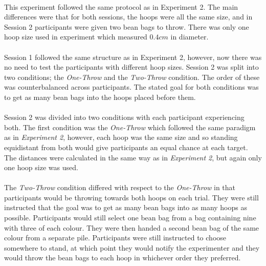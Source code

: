 \documentclass[12pt]{article}
\begin{document}
\paragraph{} This experiment followed the same protocol as in Experiment 2. The main differences were that for both sessions, the hoops were all the same size, and in Session 2 participants were given two bean bags to throw. There was only one hoop size used in experiment which measured $0.4cm$ in diameter.

\paragraph{} Session 1 followed the same structure as in Experiment 2, however, now there was no need to test the participants with different hoop sizes. Session 2 was split into two conditions; the \textit{One-Throw} and the \textit{Two-Throw} condition. The order of these was counterbalanced across participants. The stated goal for both conditions was to get as many bean bags into the hoops placed before them.

\paragraph{} Session 2 was divided into two conditions with each participant experiencing both. The first condition was the \textit{One-Throw} which followed the same paradigm as in \textit{Experiment 2}, however, each hoop was the same size and so standing equidistant from both would give participants an equal chance at each target. The distances were calculated in the same way as in \textit{Experiment 2}, but again only one hoop size was used. 

\paragraph{} The \textit{Two-Throw} condition differed with respect to the \textit{One-Throw} in that participants would be throwing towards both hoops on each trial. They were still instructed that the goal was to get as many bean bags into as many hoops as possible. Participants would still select one bean bag from a bag containing nine with three of each colour. They were then handed a second bean bag of the same colour from a separate pile. Participants were still instructed to choose somewhere to stand, at which point they would notify the experimenter and they would throw the bean bags to each hoop in whichever order they preferred. 
\end{document}

